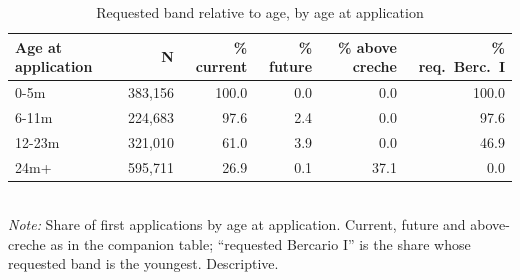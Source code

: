 \begin{table}[htbp]\centering
\caption{Requested band relative to age, by age at application}
\label{tab:A4_faixa_idade}
\small
\setlength{\tabcolsep}{4pt}
\begin{tabular}{lrrrrr}
\toprule
Age at application & N & \% current & \% future & \% above creche & \% req.\ Berc.\ I \\
\midrule
0-5m & 383,156 & 100.0 & 0.0 & 0.0 & 100.0 \\
6-11m & 224,683 & 97.6 & 2.4 & 0.0 & 97.6 \\
12-23m & 321,010 & 61.0 & 3.9 & 0.0 & 46.9 \\
24m+ & 595,711 & 26.9 & 0.1 & 37.1 & 0.0 \\
\bottomrule
\end{tabular}
\\[3pt]{\footnotesize \textit{Note:} Share of first applications by age at application. Current, future and above-creche as in the companion table; ``requested Bercario I'' is the share whose requested band is the youngest. Descriptive.}
\end{table}
